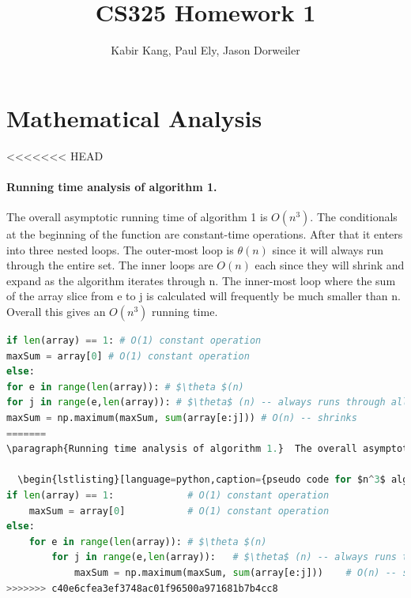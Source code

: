 \documentclass[a4paper,12pt]{article}
\title{CS325 Homework 1}
\author{Kabir Kang, Paul Ely, Jason Dorweiler}
\begin{document}
\maketitle

\section{Mathematical Analysis}


<<<<<<< HEAD
\paragraph{Running time analysis of algorithm 1.} The overall asymptotic running time of algorithm 1 is $O(n^3)$. The conditionals at the beginning of the function are constant-time operations. After that it enters into three nested loops. The outer-most loop is $\theta(n)$ since it will always run through the entire set. The inner loops are $O(n)$ each since they will shrink and expand as the algorithm iterates through n. The inner-most loop where the sum of the array slice from e to j is calculated will frequently be much smaller than n. Overall this gives an $O(n^3)$ running time.

  \begin{lstlisting}[language=python,caption={pseudo code for $n^3$ algorithm},mathescape]
if len(array) == 1: # O(1) constant operation
maxSum = array[0] # O(1) constant operation
else:
for e in range(len(array)): # $\theta $(n)
for j in range(e,len(array)): # $\theta$ (n) -- always runs through all elements
maxSum = np.maximum(maxSum, sum(array[e:j])) # O(n) -- shrinks
=======
\paragraph{Running time analysis of algorithm 1.}  The overall asymptotic running time of algorithm 1 is $O(n^3)$. The conditionals at the beginning of the function are constant-time operations. After that it enters into three nested loops. The outer-most loop is $\theta(n)$ since it will always run through the entire set. The inner loops are $O(n)$ each since they will shrink and expand as the algorithm iterates through n. The inner-most loop where the sum of the array slice from e to j is calculated will frequently be much smaller than n. Overall this gives an $O(n^3)$ running time. 

  \begin{lstlisting}[language=python,caption={pseudo code for $n^3$ algorithm},mathescape]
if len(array) == 1:				# O(1) constant operation
	maxSum = array[0]			# O(1) constant operation
else:
	for e in range(len(array)):	# $\theta $(n)
		for j in range(e,len(array)):	# $\theta$ (n) -- always runs through all elements
			maxSum = np.maximum(maxSum, sum(array[e:j]))	# O(n) -- shrinks
>>>>>>> c40e6cfea3ef3748ac01f96500a971681b7b4cc8
  \end{lstlisting}
\end{document}
